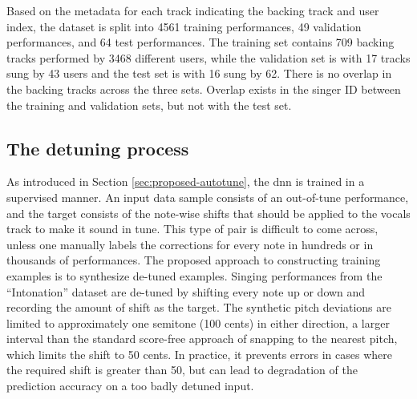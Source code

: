 Based on the metadata for each track indicating the backing track and user index, the dataset is split into 4561 training performances, 49 validation performances, and 64 test performances. The training set contains 709 backing tracks performed by 3468 different users, while the validation set is with 17 tracks sung by 43 users and the test set is with 16 sung by 62. There is no overlap in the backing tracks across the three sets. Overlap exists in the singer ID between the training and validation sets, but not with the test set. 


\subsection{The detuning process}
As introduced in Section \ref{sec:proposed-autotune}, the \gls{dnn} is trained in a supervised manner. An input data sample consists of an out-of-tune performance, and the target consists of the note-wise shifts that should be applied to the vocals track to make it sound in tune. This type of pair is difficult to come across, unless one manually labels the corrections for every note in hundreds or in thousands of performances. The proposed approach to constructing training examples is to synthesize de-tuned examples. Singing performances from the ``Intonation'' dataset are de-tuned by shifting every note up or down and recording the amount of shift as the target. The synthetic pitch deviations are limited to approximately one semitone (100 cents) in either direction, a larger interval than the standard score-free approach of snapping to the nearest pitch, which limits the shift to 50 cents. In practice, it prevents errors in cases where the required shift is greater than 50, but can lead to degradation of the prediction accuracy on a too badly detuned input. 


